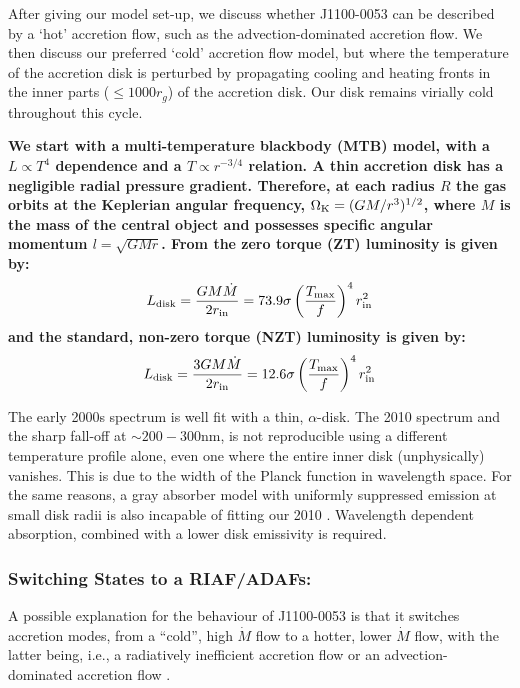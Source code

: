 \documentclass[a4paper,fleqn,usenatbib]{mnras}
\begin{document}
After giving our model set-up, we discuss whether J1100-0053 can be
described by a `hot' accretion flow, such as the advection-dominated
accretion flow. We then discuss our preferred `cold' accretion flow
model, but where the temperature of the accretion disk is perturbed by
propagating cooling and heating fronts in the inner parts ($\leq 1000
r_{g}$) of the accretion disk. Our disk remains virially cold
throughout this cycle.

{\bf 
We start with a multi-temperature blackbody (MTB) model, with a $L
\propto T^4$ dependence and a $T \propto r^{-3/4}$ relation. A thin
accretion disk has a negligible radial pressure gradient. Therefore,
at each radius $R$ the gas orbits at the Keplerian angular frequency,
$\Omega_{\rm K} = (GM/r^{3})^{1/2}$, where $M$ is the mass of the
central object and possesses specific angular momentum $l= \sqrt{GMr}$. 
From \citet{Zimmerman2005} the zero torque (ZT)
luminosity is given by:
\begin{equation}
L_{\rm disk}   =  \frac{G M \dot{M}}  {2 r_{\rm in}}    = 73.9 \sigma\left ( \frac{T_{\rm max}}{f}  \right )^{4}  r^{2}_{\rm in} 
\end{equation}
and the standard, non-zero torque (NZT) luminosity is given by:
\begin{equation}
L_{\rm disk} = \frac{3 G M \dot{M}}  {2 r_{\rm in}}    = 12.6 \sigma\left ( \frac{T_{\rm max}}{f}  \right )^{4}  r^{2}_{\rm in} 
\end{equation} 

The early 2000s spectrum is well fit with a thin, \citet{SS73}
$\alpha$-disk. The 2010 spectrum and the sharp fall-off at $\sim
200-300$nm, is not reproducible using a different temperature profile
alone, even one where the entire inner disk (unphysically)
vanishes. This is due to the width of the Planck function in
wavelength space. For the same reasons, a gray absorber model with
uniformly suppressed emission at small disk radii is also incapable of
fitting our 2010 \citep[or the J2317+0005 spectrum in
][]{Guo2016}. Wavelength dependent absorption, combined with a lower
disk emissivity is required.

\subsubsection{Switching States to a RIAF/ADAFs:}
A possible explanation for the behaviour of J1100-0053 is that it
switches accretion modes, from a ``cold'', high $\dot{M}$ flow to a
hotter, lower $\dot{M}$ flow, with the latter being, i.e., a
radiatively inefficient accretion flow \citep[RIAF; ][]{Narayan1998,
Quataert2001} or an advection-dominated accretion flow \citep[ADAF;
][and references therein]{YuanNarayan2014}.

}
\end{document}
